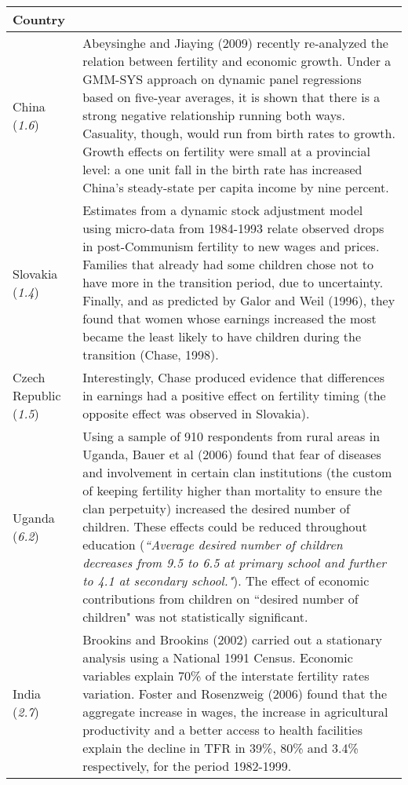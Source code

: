 \documentclass[12pt]{article}%
\begin{document}
\begin{table}[h] \begin{center}
\begin{tabularx}{\linewidth}{lX}
Country & \\
\hline
China (\emph{1.6}) & Abeysinghe and Jiaying (2009) recently re-analyzed the relation between fertility and economic growth. Under a GMM-SYS approach on dynamic panel regressions based on five-year averages, it is shown that there is a strong negative relationship running both ways. Casuality, though, would run from birth rates to growth. Growth effects on fertility were small at a provincial level: a one unit fall in the birth rate has increased China's steady-state per capita income by nine percent.\\
Slovakia (\emph{1.4}) & Estimates from a dynamic stock adjustment model using micro-data from 1984-1993 relate observed drops in post-Communism fertility to new wages and prices. Families that already had some children chose not to have more in the transition period, due to uncertainty. Finally, and as predicted by Galor and Weil (1996), they found that women whose earnings increased the most became the least likely to have children during the transition (Chase, 1998).  \\
Czech Republic (\emph{1.5}) & Interestingly, Chase produced evidence that differences in earnings had a positive effect on fertility timing (the opposite effect was observed in Slovakia). \\
Uganda (\emph{6.2}) & Using a sample of 910 respondents from rural areas in Uganda, Bauer et al (2006) found that fear of diseases and involvement in certain clan institutions (the custom of keeping fertility higher than mortality to ensure the clan perpetuity) increased the desired number of children. These effects could be reduced throughout education (\emph{``Average desired number of children decreases from 9.5 to 6.5 at primary school and further to 4.1 at secondary school."}). The effect of economic contributions from children on ``desired number of children" was not statistically significant.\\
India (\emph{2.7}) & Brookins and Brookins (2002) carried out a stationary analysis using a National 1991 Census. Economic variables explain 70\% of the interstate fertility rates variation. Foster and Rosenzweig (2006) found that the aggregate increase in wages, the increase in agricultural productivity and a better access to health facilities explain the decline in TFR in 39\%, 80\% and 3.4\% respectively, for the period 1982-1999. \\

\end{tabularx}
\end{center}
\end{table}
\end{document}
